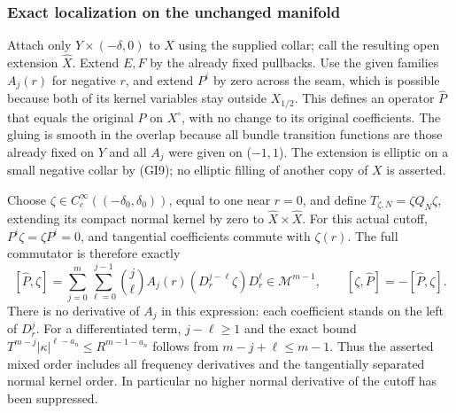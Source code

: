 \documentclass[
  11pt,
]{article}
\begin{document}
\subsubsection{Exact localization on the unchanged
manifold}\label{exact-localization-on-the-unchanged-manifold}

Attach only \(Y\times(-\delta,0)\) to \(X\) using the supplied collar;
call the resulting open extension \(\widehat X\). Extend \(E,F\) by the
already fixed pullbacks. Use the given families \(A_j(r)\) for negative
\(r\), and extend \(P^i\) by zero across the seam, which is possible
because both of its kernel variables stay outside \(X_{1/2}\). This
defines an operator \(\widehat P\) that equals the original \(P\) on
\(X^\circ\), with no change to its original coefficients. The gluing is
smooth in the overlap because all bundle transition functions are those
already fixed on \(Y\) and all \(A_j\) were given on (\(-1,1\)). The
extension is elliptic on a small negative collar by (GI9); no elliptic
filling of another copy of \(X\) is asserted.

Choose \(\zeta\in C_c^\infty((-\delta_0,\delta_0))\), equal to one near
\(r=0\), and define \(T_{\zeta,N}=\zeta Q_N\zeta\), extending its
compact normal kernel by zero to \(\widehat X\times\widehat X\). For
this actual cutoff, \(P^i\zeta=\zeta P^i=0\), and tangential
coefficients commute with \(\zeta(r)\). The full commutator is therefore
exactly \[
 [\widehat P,\zeta]
 =\sum_{j=0}^{m}\sum_{\ell=0}^{j-1}
 \binom j\ell A_j(r)(D_r^{j-\ell}\zeta)D_r^\ell
 \in\mathscr M^{m-1},
 \qquad [\zeta,\widehat P]=-[\widehat P,\zeta].
 \tag{GI38}
\] There is no derivative of \(A_j\) in this expression: each
coefficient stands on the left of \(D_r^j\). For a differentiated term,
\(j-\ell\geq1\) and the exact bound
\(T^{m-j}|\kappa|^{\ell-a_n}\leq R^{m-1-a_n}\) follows from
\(m-j+\ell\leq m-1\). Thus the asserted mixed order includes all
frequency derivatives and the tangentially separated normal kernel
order. In particular no higher normal derivative of the cutoff has been
suppressed.
\end{document}
